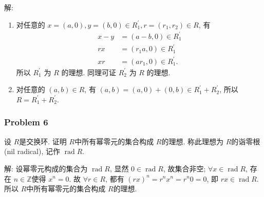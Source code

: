 \documentclass[a4paper,12pt]{ctexart}
\newcommand{\Z}{\mathbb{Z}}
\begin{document}
    解: \begin{enumerate}[label=(\arabic{*})]
      \item 对任意的 $x=(a, 0), y=(b, 0) \in R_1^{\prime}, r=\left(r_1, r_2\right) \in R$, 有
      \begin{align*}
      x-y &=(a-b, 0) \in R_1^{\prime} \\
      r x &=\left(r_1 a, 0\right) \in R_1^{\prime} \\
      x r &=\left(a r_1, 0\right) \in R_1^{\prime}.
      \end{align*}
      所以 $R_1^{\prime}$ 为 $R$ 的理想. 同理可证 $R_2^{\prime}$ 为 $R$ 的理想.
      \item 对任意的 $(a, b) \in R$, 有 $(a, b)=(a, 0)+(0, b) \in R_1^{\prime}+R_2^{\prime}$, 所以 $R=R_1^{\prime}+R_2^{\prime}$. 
    \end{enumerate}

\subsubsection*{Problem 6}
    设 $ R $是交换环. 证明 $ R $中所有幂零元的集合构成 $ R $的理想. 称此理想为 $ R $的诣零根 (nil radical), 记作
    $ \operatorname{rad} R $.

    解: 设幂零元构成的集合为 $ \operatorname{rad}R $, 显然 $ 0\in\operatorname{rad}R $, 故集合非空;
    $ \forall x\in\operatorname{rad}R $, 存在 $ n\in\Z $使得 $ x^n=0 $. 故 $ \forall r\in R $, 都有
    $ (rx)^n=r^nx^n=r^n0=0 $, 即 $ rx\in\operatorname{rad}R $. 所以 $ R $中所有幂零元的集合构成 $ R $的理想.
\end{document}
